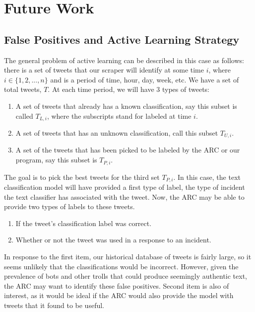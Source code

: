 \documentclass[titlepage, 12pt]{article}
\begin{document}
\section{Future Work}

\subsection{False Positives and Active Learning Strategy}

\hspace{0.5 cm}The general problem of active learning can be described in this case as follows: there is a set of tweets that our scraper will identify at some time $i$, where $i \in \{1, 2,..., n\}$ and is a period of time, hour, day, week, etc. We have a set of total tweets, $T$. At each time period, we will have 3 types of tweets:
\begin{enumerate}
    \item A set of tweets that already has a known classification, say this subset is called $T_{L,i}$, where the subscripts stand for labeled at time $i$.
    \item A set of tweets that has an unknown classification, call this subset $T_{U,i}$.
    \item A set of the tweets that has been picked to be labeled by the ARC or our program, say this subset is $T_{P,i}$.
\end{enumerate}
The goal is to pick the best tweets for the third set $T_{P,i}$. In this case, the text classification model will have provided a first type of label, the type of incident the text classifier has associated with the tweet. Now, the ARC may be able to provide two types of labels to these tweets.
\begin{enumerate}
    \item If the tweet's classification label was correct.
    \item Whether or not the tweet was used in a response to an incident.
\end{enumerate}
\hspace{0.5 cm}In response to the first item, our historical database of tweets is fairly large, so it seems unlikely that the classifications would be incorrect. However, given the prevalence of bots and other trolls that could produce seemingly authentic text, the ARC may want to identify these false positives. Second item is also of interest, as it would be ideal if the ARC would also provide the model with tweets that it found to be useful. 
\end{document}

